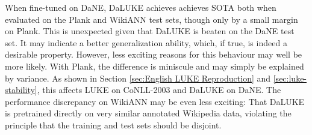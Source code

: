 \documentclass[main.tex]{subfiles}
\begin{document}
When fine-tuned on DaNE, DaLUKE achieves achieves SOTA both when evaluated on the Plank and WikiANN test sets, though only by a small margin on Plank.
This is unexpected given that DaLUKE is beaten on the DaNE test set.
It may indicate a better generalization ability, which, if true, is indeed a desirable property.
However, less exciting reasons for this behaviour may well be more likely.
With Plank, the difference is miniscule and may simply be explained by variance.
As shown in Section \ref{sec:English LUKE Reproduction} and \ref{sec:luke-stability}, this affects LUKE on CoNLL-2003 and DaLUKE on DaNE.
The performance discrepancy on WikiANN may be even less exciting:
That DaLUKE is pretrained directly on very similar annotated Wikipedia data, violating the principle that the training and test sets should be disjoint.
\end{document}

